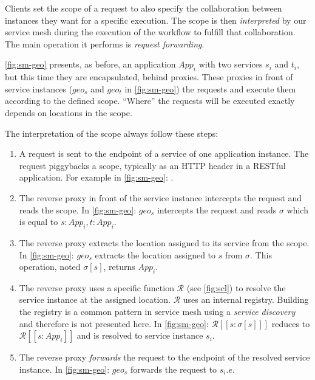 Clients set the scope of a request to also specify the collaboration
between instances they want for a specific execution.
%
The scope is then \emph{interpreted} by our service mesh during the
execution of the workflow to fulfill that collaboration.
%
The main operation it performs is \emph{request forwarding}.
%

\autoref{fig:sm-geo} presents, as before, an application $App_i$ with
two services $s_i$ and $t_i$, but this time they are encapsulated,
behind proxies.
%
These proxies in front of service instances ($\mathit{geo_s}$ and
$\mathit{geo_t}$ in \autoref{fig:sm-geo}) the requests and execute
them according to the defined scope.
%
``Where'' the requests will be executed exactly depends on locations
in the scope.
%



The interpretation of the scope always follow these steps:
\begin{enumerate}
\item
  A request is sent to the endpoint of a service of one
  application instance.  The request piggybacks a scope, typically as
  an HTTP header in a RESTful application. For example in
  \autoref{fig:sm-geo}: .

\item
  The reverse proxy in front of the service instance intercepts the
  request and reads the scope. In \autoref{fig:sm-geo}: $geo_s$
  intercepts the request and reads $\sigma$ which is equal to
  $\mathit{s: App_i, t: App_i}$.

\item
  The reverse proxy extracts the location assigned to its service from
  the scope.  In \autoref{fig:sm-geo}: $geo_s$ extracts the location
  assigned to $s$ from $\sigma$. This operation, noted $\sigma[s]$,
  returns $\mathit{App_i}$.

\item
  The reverse proxy uses a specific function $\mathcal{R}$ (see
  \autoref{fig:scl}) to resolve the service instance at the assigned
  location.  $\mathcal{R}$ uses an internal registry.  Building the
  registry is a common pattern in service mesh using a \emph{service
  discovery}~\cite{LLGZG19} and therefore is not presented here.  In
  \autoref{fig:sm-geo}: $\mathcal{R}[\![ s: \sigma[s] ]\!]$ reduces to
  $\mathcal{R}[\![ \mathit{s : App_i} ]\!]$ and is resolved to service
  instance $s_i$.
\item
  The reverse proxy \emph{forwards} the request to the endpoint of the
  resolved service instance. In \autoref{fig:sm-geo}: $geo_s$ forwards
  the request to $s_i.e$.
\end{enumerate}



